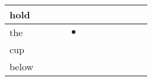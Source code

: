 \documentclass[landscape]{article}
\newcommand{\ssp}{\hspace{2pt}}
\newcommand{\mex}{\cellcolor{g}$\bullet$}
\begin{document}
\begin{tabular}{|l|p{10pt}|p{10pt}|p{10pt}|p{10pt}|p{10pt}|p{10pt}|p{10pt}|p{10pt}|p{10pt}|p{10pt}|p{10pt}|}
\hline
\ssp hold \ssp&\hspace{2pt}&\hspace{2pt}&\hspace{2pt}&\hspace{2pt}&\hspace{2pt}&\hspace{2pt}&\hspace{2pt}&\hspace{2pt}&\hspace{2pt}&\hspace{2pt}&\hspace{2pt}\\
\hline
\ssp \cellcolor{ref3}the \ssp&\hspace{2pt}&\hspace{2pt}&\hspace{2pt}&\hspace{2pt}\mex&\hspace{2pt}&\hspace{2pt}&\hspace{2pt}&\hspace{2pt}&\hspace{2pt}&\hspace{2pt}&\hspace{2pt}\\
\hline
\ssp cup \ssp&\hspace{2pt}&\hspace{2pt}&\hspace{2pt}&\hspace{2pt}&\hspace{2pt}&\hspace{2pt}&\hspace{2pt}&\hspace{2pt}&\hspace{2pt}&\hspace{2pt}&\hspace{2pt}\\
\hline
\ssp below \ssp&\hspace{2pt}&\hspace{2pt}&\hspace{2pt}&\hspace{2pt}&\hspace{2pt}&\hspace{2pt}&\hspace{2pt}&\hspace{2pt}&\hspace{2pt}&\hspace{2pt}&\hspace{2pt}\\

\end{tabular}
\end{document}
